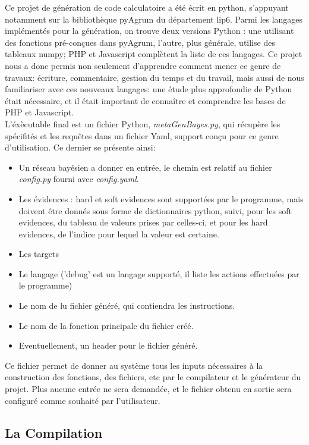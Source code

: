 \documentclass[a4paper]{article}
\begin{document}
Ce projet de génération de code calculatoire a été écrit en python, s'appuyant notamment sur la bibliothèque pyAgrum du département lip6. Parmi les langages implémentés pour la génération, on trouve deux versions
Python : une utilisant des fonctions pré-conçues dans pyAgrum, l'autre, plus générale, utilise des tableaux numpy; PHP et Javascript complètent la liste de ces langages. Ce projet nous a donc permis non seulement
d'apprendre comment mener ce genre de travaux: écriture, commentaire, gestion du temps et du travail, mais aussi de nous familiariser avec ces nouveaux langages: une étude plus approfondie de Python était 
nécessaire, et il était important de connaître et comprendre les bases de PHP et Javascript. \\
L'éxècutable final est un fichier Python, \textit{metaGenBayes.py}, qui récupère les spécifités et les requêtes dans un fichier Yaml, support conçu pour ce genre d'utilisation. Ce dernier se présente ainsi:
\begin{itemize}
 \item Un réseau bayésien a donner en entrée, le chemin est relatif au fichier \textit{config.py} fourni avec \textit{config.yaml}.
 \item Les évidences : hard et soft evidences sont supportées par le programme, mais doivent être donnés sous forme de dictionnaires python, suivi, pour les soft evidences, du tableau de valeurs prises par celles-ci,
et pour les hard evidences, de l'indice pour lequel la valeur est certaine. 
 \item Les targets
 \item Le langage ('debug' est un langage supporté, il liste les actions effectuées par le programme)
 \item Le nom de lu fichier généré, qui contiendra les instructions.
 \item Le nom de la fonction principale du fichier créé.
 \item Eventuellement, un header pour le fichier généré.
\end{itemize}
Ce fichier permet de donner au système tous les inputs nécessaires à la construction des fonctions, des fichiers, etc par le compilateur et le générateur du projet. Plus aucune entrée ne sera demandée,
et le fichier obtenu en sortie sera configuré comme souhaité par l'utilisateur.\\

  \subsection{La Compilation}
\end{document}
